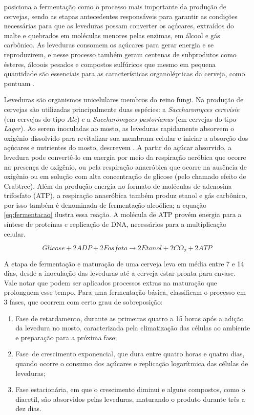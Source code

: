  posiciona a fermentação como o processo mais importante da produção de cervejas, sendo as etapas
antecedentes responsáveis para garantir as condições necessárias para que as leveduras possam converter os açúcares,
extraídos do malte e quebrados em moléculas menores pelas enzimas, em álcool e gás carbônico. As leveduras consomem 
os açúcares para gerar energia e se reproduzirem, e nesse processo também geram centenas de subprodutos como ésteres, álcoois pesados e compostos sulfúricos que mesmo em pequena quantidade são essenciais para as características organolépticas da cerveja, como
pontuam .

Leveduras são organismos unicelulares membros do reino fungi. Na produção de cervejas são utilizadas principalmente 
duas espécies: a \textit{Saccharomyces cerevisie} (em cervejas do tipo \textit{Ale}) e a \textit{Saccharomyces pastorianus} (em cervejas do tipo \textit{Lager}). Ao serem inoculadas ao mosto, as leveduras rapidamente absorvem o oxigênio dissolvido para revitalizar sua membrana celular e iniciar a absorção dos açúcares e nutrientes do mosto, descrevem .
A partir do açúcar absorvido, a levedura pode convertê-lo em energia por meio da respiração aeróbica que ocorre na presença de oxigênio, ou pela respiração anaeróbica que ocorre na ausência de oxigênio ou em solução com alta concentração de glicose (pelo chamado efeito de Crabtree). 
Além da produção energia no formato de moléculas de adenosina trifosfato (ATP), a respiração anaeróbica também produz etanol e gás carbônico, por isso também é denominada de fermentação alcoólica; a equação \ref{eq:fermentacao} ilustra essa reação. A molécula de ATP provém energia para a síntese de proteínas e replicação de DNA, necessários para a multiplicação celular.

\begin{equation}
    Glicose + 2 ADP + 2 Fosfato \longrightarrow 2 Etanol + 2 CO_2 + 2 ATP
    \label{eq:fermentacao}
\end{equation}

A etapa de fermentação e maturação de uma cerveja leva em média entre 7 e 14 dias, desde a inoculação das leveduras até a cerveja estar pronta para envase. Vale notar que podem ser aplicados processos extras na maturação que prolonguem esse tempo.
Para uma fermentação básica,  classificam o processo em 3 fases, que ocorrem com certo grau de sobreposição:
\begin{enumerate}
    \item Fase de retardamento, durante as primeiras quatro a 15 horas após a adição
da levedura no mosto, caracterizada pela climatização das células ao
ambiente e preparação para a próxima fase;
    \item Fase de crescimento exponencial, que dura entre quatro horas e quatro dias,
quando ocorre o consumo dos açúcares e replicação logarítmica das células
de leveduras;
    \item Fase estacionária, em que o crescimento diminui e alguns compostos, como o diacetil, são
absorvidos pelas leveduras, maturando o produto durante três a dez dias.
\end{enumerate}

